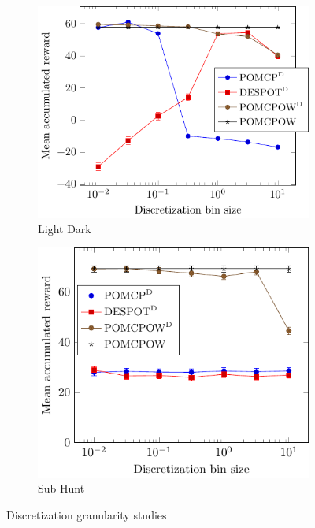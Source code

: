 \begin{figure}[htb]
    \centering
    \begin{subfigure}{0.48\linewidth}
        \centering
        \includegraphics[width=0.97\linewidth]{media/ld_discretization.pdf}
        \caption{Light Dark} \label{fig:lddisc}
    \end{subfigure}
    \begin{subfigure}{0.48\linewidth}
        \centering
        \includegraphics[width=0.9\linewidth]{media/subhunt_discretization.pdf}
        \caption{Sub Hunt}
        \label{fig:shdisc}
    \end{subfigure}

    \caption{Discretization granularity studies} \label{fig:disc}
\end{figure}



